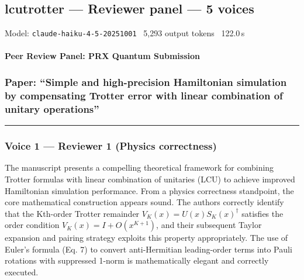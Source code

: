 \documentclass[10pt,letterpaper]{article}
\begin{document}
\subsection{lcutrotter --- Reviewer panel — 5 voices}
\noindent\textcolor{muted}{\small Model: \texttt{claude-haiku-4-5-20251001} \textperiodcentered\ 5,293 output tokens \textperiodcentered\ 122.0\,s}

\hypertarget{peer-review-panel-prx-quantum-submission}{%
\paragraph{Peer Review Panel: PRX Quantum Submission}\label{peer-review-panel-prx-quantum-submission}}

\hypertarget{paper-simple-and-high-precision-hamiltonian-simulation-by-compensating-trotter-error-with-linear-combination-of-unitary-operations}{%
\subsubsection{Paper: ``Simple and high-precision Hamiltonian simulation by compensating Trotter error with linear combination of unitary operations''}\label{paper-simple-and-high-precision-hamiltonian-simulation-by-compensating-trotter-error-with-linear-combination-of-unitary-operations}}

\begin{center}\rule{0.5\linewidth}{0.5pt}\end{center}

\hypertarget{voice-1-reviewer-1-physics-correctness}{%
\subsubsection{Voice 1 --- Reviewer 1 (Physics correctness)}\label{voice-1-reviewer-1-physics-correctness}}

The manuscript presents a compelling theoretical framework for combining Trotter formulas with linear combination of unitaries (LCU) to achieve improved Hamiltonian simulation performance. From a physics correctness standpoint, the core mathematical construction appears sound. The authors correctly identify that the Kth-order Trotter remainder \(V_K(x) = U(x)S_K(x)^\dagger\) satisfies the order condition \(V_K(x) = I + O(x^{K+1})\), and their subsequent Taylor expansion and pairing strategy exploits this property appropriately. The use of Euler's formula (Eq. 7) to convert anti-Hermitian leading-order terms into Pauli rotations with suppressed 1-norm is mathematically elegant and correctly executed.
\end{document}
